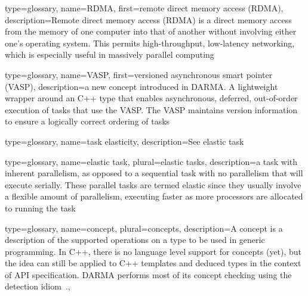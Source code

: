 {
  type={glossary},
  name={RDMA},
  first={remote direct memory access (RDMA)},
  description={Remote direct memory access (RDMA) is a direct memory
  access from the memory of one computer into that of another without
  involving either one's operating system. This permits
  high-throughput, low-latency networking, which is especially useful
  in massively parallel computing}
}

{
  type={glossary},
  name={VASP},
  first={versioned asynchronous smart pointer (VASP)},
  description={a new concept introduced in DARMA. A lightweight wrapper around 
   an C++ type that enables asynchronous, deferred, out-of-order execution of tasks that
   use the VASP.  The VASP maintains version information to ensure a logically correct
   ordering of tasks}
}

{
  type={glossary},
  name={task elasticity},
  description={See \gls{elastic task}}
}

{
  type={glossary},
  name={elastic task},
  plural={elastic tasks},
  description={a task with inherent parallelism, as opposed to a sequential task with no parallelism that will
    execute serially.  These parallel tasks are termed elastic since they usually involve a flexible amount of parallelism,
    executing faster as more processors are allocated to running the task}
}

{
  type={glossary},
  name={concept},
  plural={concepts},
  description={A concept is a description of the supported operations on a type
  to be used in generic programming.  In C++, there is no language level support
  for concepts (yet), but the idea can still be applied to C++ templates and
  deduced types in the context of API specification.  DARMA performs most of
  its concept checking using the  detection idiom~\cite{DetectionIdiom}.},
}


